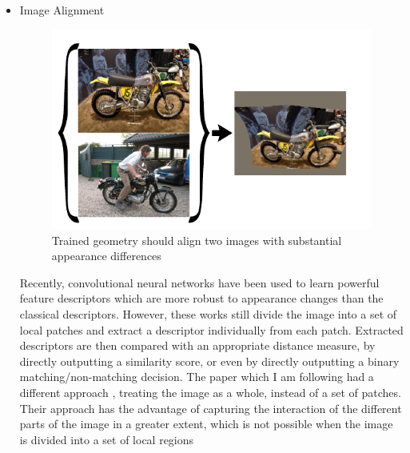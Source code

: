 \documentclass[12pt, a4paper,twoside]{article}
\begin{document}
\begin{itemize}
	\item Image Alignment

	\begin{figure}[htbp]
\centering
  \includegraphics[scale=0.5]{images/Alignment}
  \caption{Trained geometry should
align two images with substantial appearance differences
}\label{fig:figure1}
\end{figure}      

	Recently, convolutional neural networks have been used to learn powerful feature descriptors which are more robust
	to appearance changes than the classical descriptors. However, these works still divide the image into
	a set of local patches and extract a descriptor individually from each patch. Extracted descriptors are then compared
	with an appropriate distance measure, by directly outputting a similarity score, or even by directly
	outputting a binary matching/non-matching decision. The paper which I am following had a different approach \cite{align}, treating the
	image as a whole, instead of a set of patches. Their approach has the advantage of capturing the interaction of the different
	parts of the image in a greater extent, which is not possible when the image is divided into a set of local regions

\end{itemize}
\end{document}
